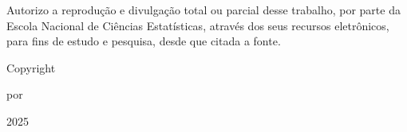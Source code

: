 
\begin{fichacatalografica}

\begin{flushleft}
Autorizo a reprodução e divulgação total ou parcial desse  
trabalho, por parte da Escola Nacional de Ciências Estatísticas,  
através dos seus recursos eletrônicos, para fins de estudo e  
pesquisa, desde que citada a fonte.  
\end{flushleft}

    \vspace*{\fill}\vspace*{\fill}
    
\begin{center}
Copyright \par por \par \imprimirautor \par 2025
\end{center}




	\sffamily
	\vspace*{\fill}					%
	\begin{center}					%
	\end{center}
\end{fichacatalografica}
